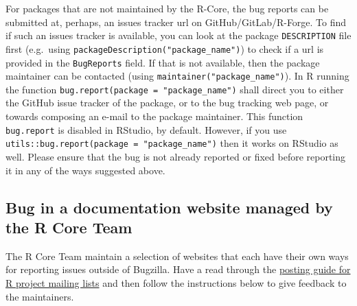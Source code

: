 \documentclass[
  letterpaper,
  DIV=11,
  numbers=noendperiod]{scrreprt}
\begin{document}
For packages that are not maintained by the R-Core, the bug reports can
be submitted at, perhaps, an issues tracker url on
GitHub/GitLab/R-Forge. To find if such an issues tracker is available,
you can look at the package \texttt{DESCRIPTION} file first (e.g.~using
\texttt{packageDescription("package\_name")}) to check if a url is
provided in the \texttt{BugReports} field. If that is not available,
then the package maintainer can be contacted (using
\texttt{maintainer("package\_name")}). In R running the function
\texttt{bug.report(package\ =\ "package\_name")} shall direct you to
either the GitHub issue tracker of the package, or to the bug tracking
web page, or towards composing an e-mail to the package maintainer. This
function \texttt{bug.report} is disabled in RStudio, by default.
However, if you use
\texttt{utils::bug.report(package\ =\ "package\_name")} then it works on
RStudio as well. Please ensure that the bug is not already reported or
fixed before reporting it in any of the ways suggested above.

\subsection{Bug in a documentation website managed by the R Core
Team}\label{docWebsRCoreBug}

The R Core Team maintain a selection of websites that each have their
own ways for reporting issues outside of Bugzilla. Have a read through
the \href{https://www.r-project.org/posting-guide.html}{posting guide
for R project mailing lists} and then follow the instructions below to
give feedback to the maintainers.
\end{document}
